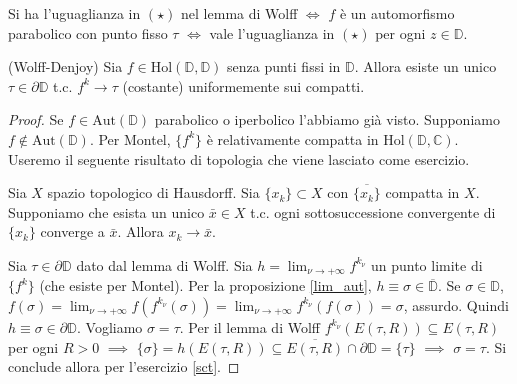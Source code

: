 \begin{exc}
  Si ha l'uguaglianza in $(\star)$ nel lemma di Wolff $\iff$ $f$ è un automorfismo parabolico con punto fisso $\tau$ $\iff$ vale l'uguaglianza in $(\star)$ per ogni $z \in \mathbb{D}$.
\end{exc}

\begin{thm}
  (Wolff-Denjoy) Sia $f \in \text{Hol}(\mathbb{D}, \mathbb{D})$ senza punti fissi in $\mathbb{D}$. Allora esiste un unico $\tau \in \partial\mathbb{D}$ t.c. $f^k \longrightarrow \tau$ (costante) uniformemente sui compatti.
\end{thm}

\begin{proof}
  Se $f \in \text{Aut}(\mathbb{D})$ parabolico o iperbolico l'abbiamo già visto. Supponiamo $f \not\in \text{Aut}(\mathbb{D})$. Per Montel, $\{f^k\}$ è relativamente compatta in $\text{Hol}(\mathbb{D}, \mathbb{C})$. Useremo il seguente risultato di topologia che viene lasciato come esercizio.

  \begin{exc} \label{sct}
    Sia $X$ spazio topologico di Hausdorff. Sia $\{x_k\} \subset X$ con $\overline{\{x_k\}}$ compatta in $X$. Supponiamo che esista un unico $\bar{x} \in X$ t.c. ogni sottosuccessione convergente di $\{x_k\}$ converge a $\bar{x}$. Allora $x_k \longrightarrow \bar{x}$.
  \end{exc}

  Sia $\tau \in \partial\mathbb{D}$ dato dal lemma di Wolff. Sia $\displaystyle h=\lim_{\nu \longrightarrow +\infty} f^{k_{\nu}}$ un punto limite di $\{f^k\}$ (che esiste per Montel). Per la proposizione \ref{lim_aut}, $h \equiv \sigma \in \overline{\mathbb{D}}$.
  Se $\sigma \in \mathbb{D}$, $\displaystyle f(\sigma)=\lim_{\nu \longrightarrow +\infty} f(f^{k_{\nu}}(\sigma))=\lim_{\nu \longrightarrow +\infty} f^{k_{\nu}}(f(\sigma))=\sigma$, assurdo. Quindi $h \equiv \sigma \in \partial\mathbb{D}$.
  Vogliamo $\sigma=\tau$. Per il lemma di Wolff $f^{k_{\nu}}(E(\tau, R)) \subseteq E(\tau, R)$ per ogni $R>0$ $\implies$ $\{\sigma\}=h(E(\tau, R)) \subseteq \overline{E(\tau, R)} \cap \partial\mathbb{D}=\{\tau\}$ $\implies$ $\sigma=\tau$.
  Si conclude allora per l'esercizio \ref{sct}.
\end{proof}

